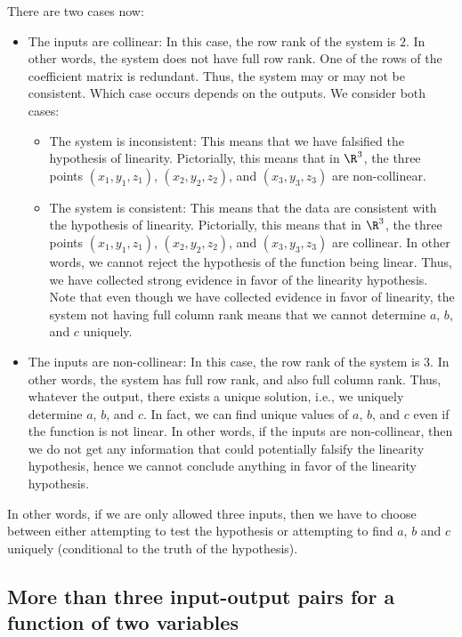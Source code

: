 \documentclass[10pt]{amsart}
\begin{document}
There are two cases now:

\begin{itemize}
\item The inputs are collinear: In this case, the row rank of the
  system is $2$. In other words, the system does not have full row
  rank. One of the rows of the coefficient matrix is redundant. Thus,
  the system may or may not be consistent. Which case occurs depends
  on the outputs. We consider both cases:

  \begin{itemize}
  \item The system is inconsistent: This means that we have falsified
    the hypothesis of linearity. Pictorially, this means that in
    $\R^3$, the three points $(x_1,y_1,z_1)$, $(x_2,y_2,z_2)$, and
    $(x_3,y_3,z_3)$ are non-collinear.
  \item The system is consistent: This means that the data are
    consistent with the hypothesis of linearity. Pictorially, this
    means that in $\R^3$, the three points $(x_1,y_1,z_1)$,
    $(x_2,y_2,z_2)$, and $(x_3,y_3,z_3)$ are collinear. In other
    words, we cannot reject the hypothesis of the function being
    linear. Thus, we have collected strong evidence in favor of the
    linearity hypothesis. Note that even though we have collected
    evidence in favor of linearity, the system not having full column
    rank means that we cannot determine $a$, $b$, and $c$ uniquely.
  \end{itemize}
\item The inputs are non-collinear: In this case, the row rank of the
  system is $3$. In other words, the system has full row rank, and
  also full column rank. Thus, whatever the output, there exists a
  unique solution, i.e., we uniquely determine $a$, $b$, and $c$. In
  fact, we can find unique values of $a$, $b$, and $c$ even if the
  function is not linear. In other words, if the inputs are
  non-collinear, then we do not get any information that could
  potentially falsify the linearity hypothesis, hence we cannot
  conclude anything in favor of the linearity hypothesis.
\end{itemize}

In other words, if we are only allowed three inputs, then we have to
choose between either attempting to test the hypothesis or attempting
to find $a$, $b$ and $c$ uniquely (conditional to the truth of the
hypothesis).

\subsection{More than three input-output pairs for a function of two variables}
\end{document}
